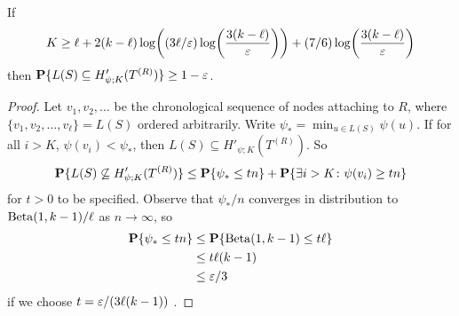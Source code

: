 \begin{prop}
  If
  \[
    K \ge \ell + 2 (k - \ell) \log \left( (3 \ell/\eps) \log
      \left( \frac{3 (k - \ell)}{\eps}\right)\right) + (7/6)
    \log \left( \frac{3 (k - \ell)}{\eps} \right)
  \]
  then $\operatorname{\mathbf{P}}\{L(S) \subseteq H'_{\psi; K}(T^{(R)})\} \ge 1 - \varepsilon$.
\end{prop}
\begin{proof}
  Let $v_1, v_2, \dots$ be the chronological sequence of nodes
  attaching to $R$, where $\{v_1, v_2, \dots, v_\ell\} = L(S)$ ordered
  arbitrarily. Write $\psi_* = \min_{u \in L(S)} \psi(u)$. If for all
  $i > K$, $\psi(v_i) < \psi_*$, then
  $L(S) \subseteq H'_{\psi; K}(T^{(R)})$. So
  \begin{equation}
    \Pr\{L(S) \not\subseteq H'_{\psi; K}(T^{(R)})\} \le \Pr\{\psi_* \le t n\} + \Pr\{ \exists i > K \colon \psi(v_i) \ge t n\} \eqlabel{phi-tail-skeleton}
  \end{equation}
  for $t > 0$ to be specified. Observe that $\psi_*/n$ converges in
  distribution to $\operatorname{Beta}(1, k - 1)/\ell$ as $n \to \infty$, so
  \begin{align*}
    \operatorname{\mathbf{P}}\{\psi_* \le tn\} &\le \operatorname{\mathbf{P}}\{\operatorname{Beta}(1, k - 1) \le t \ell \} \\
                         &\le t \ell (k - 1) \\
                         &\le \varepsilon/3
  \end{align*}
  if we choose $t = \varepsilon/(3 \ell (k - 1))$ .


\end{proof}
